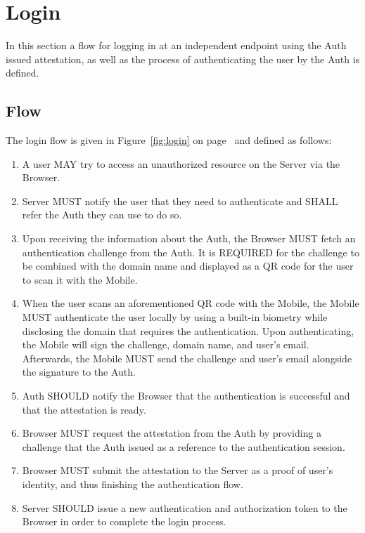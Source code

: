 \section{Login}
In this section a flow for logging in at an independent endpoint using the Auth issued attestation, as well as the 
process of authenticating the user by the Auth is defined. 

    \subsection{Flow}
    The login flow is given in Figure~\ref{fig:login} on page~\pageref{fig:login} and defined as follows:
        \begin{enumerate}
            \item A user MAY try to access an unauthorized resource on the Server via the Browser.
            \item Server MUST notify the user that they need to authenticate and SHALL refer the Auth they can use 
                  to do so.
            \item Upon receiving the information about the Auth, the Browser MUST fetch an authentication challenge
                  from the Auth. It is REQUIRED for the challenge to be combined with the domain name and
                  displayed as a QR code for the user to scan it with the Mobile.
            \item When the user scans an aforementioned QR code with the Mobile, the Mobile MUST authenticate the 
                  user locally by using a built-in biometry while disclosing the domain that requires the authentication.
                  Upon authenticating, the Mobile will sign the challenge, domain name, and user's email. Afterwards, the
                  Mobile MUST send the challenge and user's email alongside the signature to the Auth.
            \item Auth SHOULD notify the Browser that the authentication is successful and that the attestation is
                  ready.
            \item Browser MUST request the attestation from the Auth by providing a challenge that the Auth issued 
                  as a reference to the authentication session.
            \item Browser MUST submit the attestation to the Server as a proof of user's identity, and thus finishing 
                  the authentication flow.
            \item Server SHOULD issue a new authentication and authorization token to the Browser in order to complete
                  the login process.
        \end{enumerate}
        


